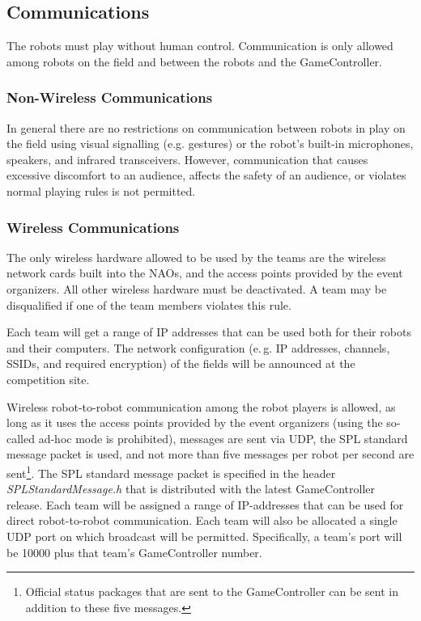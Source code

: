 \documentclass[12pt]{article}
\newcommand{\eg}{\mbox{e.\,g.}\xspace}
\begin{document}
\subsection{Communications}

The robots must play without human control. Communication is only allowed among robots on the field and between the robots and the GameController.

\subsubsection{Non-Wireless Communications}
\label{sec:acoustic}
In general there are no restrictions on communication between robots in play on the field using visual signalling (e.g. gestures) or the robot's built-in microphones, speakers, and infrared transceivers. However, communication that causes excessive discomfort to an audience, affects the safety of an audience, or violates normal playing rules is not permitted.

\subsubsection{Wireless Communications}
\label{sec:wireless}
The only wireless hardware allowed to be used by the teams are the wireless network cards built into the NAOs, and the access points provided by the event organizers. All other wireless hardware must be deactivated. A team may be disqualified if one of the team members violates this rule. 

Each team will get a range of IP addresses that can be used both for their robots and their computers. The network configuration (\eg IP addresses, channels, SSIDs, and required encryption) of the fields will be announced at the competition site.

Wireless robot-to-robot communication among the robot players is allowed, as long as it uses the access points provided by the event organizers (using the so-called ad-hoc mode is prohibited), messages are sent via UDP, the SPL standard message packet is used, and not more than five messages per robot per second are sent\footnote{Official status packages that are sent to the GameController can be sent in addition to these five messages.}. The SPL standard message packet is specified in the header \emph{SPLStandardMessage.h} that is distributed with the latest GameController release. Each team will be assigned a range of IP-addresses that can be used for direct robot-to-robot communication. Each team will also be allocated a single UDP port on which broadcast will be permitted.  Specifically, a team's port will be 10000 plus that team's GameController number.
\end{document}
